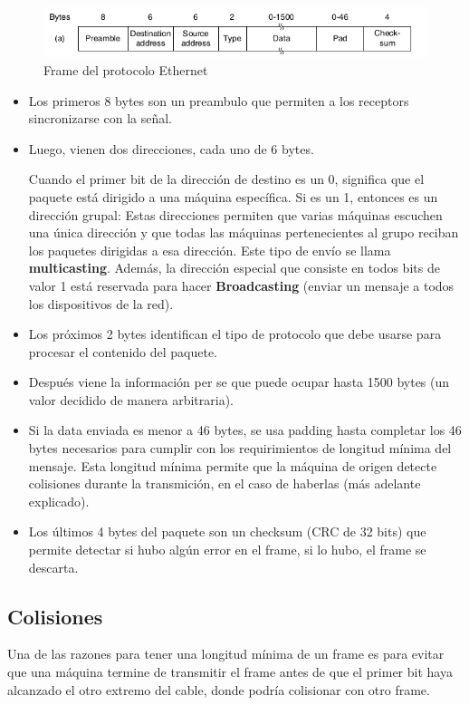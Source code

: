 \begin{figure}[H]
	\centering
	\includegraphics[width=\textwidth
]{images/ethernet-mac-frame.png}
	\caption[Frame del protocolo Ethernet]{Frame del protocolo Ethernet}
	\label{fig:ethernet-mac-frame}
\end{figure}

\begin{itemize}
  \item Los primeros 8 bytes son un preambulo que permiten a los receptors sincronizarse con la señal.
  \item Luego, vienen dos direcciones, cada uno de 6 bytes. 
  
  Cuando el primer bit de la dirección de destino es un 0, significa que el paquete está dirigido a una máquina específica.  Si es un 1, entonces es un dirección grupal: Estas direcciones permiten que varias máquinas escuchen una única dirección y que todas las máquinas pertenecientes al grupo reciban los paquetes dirigidas a esa dirección. Este tipo de envío se llama \textbf{multicasting}. Además, la dirección especial que consiste en todos bits de valor 1 está reservada para hacer \textbf{Broadcasting} (enviar un mensaje a todos los dispositivos de la red).
  \item Los próximos 2 bytes identifican el tipo de protocolo que debe usarse para procesar el contenido del paquete.
  \item Después viene la información per se que puede ocupar hasta 1500 bytes (un valor decidido de manera arbitraria).
  \item Si la data enviada es menor a 46 bytes, se usa padding hasta completar los 46 bytes necesarios para cumplir con los requirimientos de longitud mínima del mensaje. Esta longitud mínima permite que la máquina de origen detecte colisiones durante la transmición, en el caso de haberlas (más adelante explicado).
  \item Los últimos 4 bytes del paquete son un checksum (CRC de 32 bits) que permite detectar si hubo algún error en el frame, si lo hubo, el frame se descarta.
\end{itemize}

\subsection{Colisiones}
Una de las razones para tener una longitud mínima de un frame es para evitar que una máquina termine de transmitir el frame antes de que el primer bit haya alcanzado el otro extremo del cable, donde podría colisionar con otro frame.

